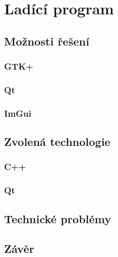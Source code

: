 \chapter{Ladící program}

\blind[2]

\section{Možnosti řešení}

\blind[1]

\subsection{GTK+}

\blind[1]

\subsection{Qt}

\blind[2]

\subsection{ImGui}

\blind[3]

\section{Zvolená technologie}

\subsection{C++}

\blind[1]

\subsection{Qt}

\blind[2]

\section{Technické problémy}

\blind[4]

\section{Závěr}

\blind[1]